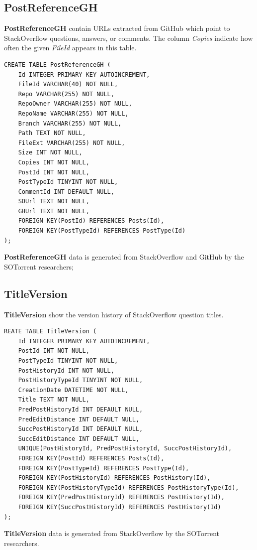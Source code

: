\documentclass[a4paper,11pt, notitlepage]{report}
\theoremstyle{definition}
\numberwithin{equation}{section}		%
\begin{document}
\subsection{PostReferenceGH}
\textbf{PostReferenceGH} contain URLs extracted from GitHub which point to StackOverflow questions, answers, or comments. The column \textit{Copies} indicate how often the given \textit{FileId} appears in this table.
\begin{lstlisting}
CREATE TABLE PostReferenceGH (
    Id INTEGER PRIMARY KEY AUTOINCREMENT,
    FileId VARCHAR(40) NOT NULL,
    Repo VARCHAR(255) NOT NULL,
    RepoOwner VARCHAR(255) NOT NULL,
    RepoName VARCHAR(255) NOT NULL,
    Branch VARCHAR(255) NOT NULL,
    Path TEXT NOT NULL,
    FileExt VARCHAR(255) NOT NULL,
    Size INT NOT NULL,
    Copies INT NOT NULL,
    PostId INT NOT NULL,
    PostTypeId TINYINT NOT NULL,
    CommentId INT DEFAULT NULL,
    SOUrl TEXT NOT NULL,
    GHUrl TEXT NOT NULL,
    FOREIGN KEY(PostId) REFERENCES Posts(Id),
    FOREIGN KEY(PostTypeId) REFERENCES PostType(Id)
);
\end{lstlisting}
\textbf{PostReferenceGH} data is generated from StackOverflow and GitHub by the SOTorrent researchers;

\subsection{TitleVersion}
\textbf{TitleVersion} show the version history of StackOverflow question titles.
\begin{lstlisting}
REATE TABLE TitleVersion (
    Id INTEGER PRIMARY KEY AUTOINCREMENT,
    PostId INT NOT NULL,
    PostTypeId TINYINT NOT NULL,
    PostHistoryId INT NOT NULL,
    PostHistoryTypeId TINYINT NOT NULL,
    CreationDate DATETIME NOT NULL,
    Title TEXT NOT NULL,
    PredPostHistoryId INT DEFAULT NULL,
    PredEditDistance INT DEFAULT NULL,
    SuccPostHistoryId INT DEFAULT NULL,
    SuccEditDistance INT DEFAULT NULL,
    UNIQUE(PostHistoryId, PredPostHistoryId, SuccPostHistoryId),
    FOREIGN KEY(PostId) REFERENCES Posts(Id),
    FOREIGN KEY(PostTypeId) REFERENCES PostType(Id),
    FOREIGN KEY(PostHistoryId) REFERENCES PostHistory(Id),
    FOREIGN KEY(PostHistoryTypeId) REFERENCES PostHistoryType(Id),
    FOREIGN KEY(PredPostHistoryId) REFERENCES PostHistory(Id),
    FOREIGN KEY(SuccPostHistoryId) REFERENCES PostHistory(Id)
);
\end{lstlisting}
\textbf{TitleVersion} data is generated from StackOverflow by the SOTorrent researchers.
\end{document}
